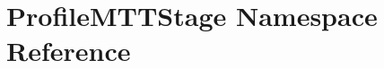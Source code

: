 \hypertarget{namespaceProfileMTTStage}{\section{Profile\-M\-T\-T\-Stage Namespace Reference}
\label{namespaceProfileMTTStage}
}
